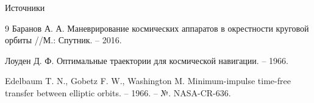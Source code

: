 \documentclass[9pt]{beamer}
\begin{document}
\begin{frame}[allowframebreaks]{Источники}
  \begin{thebibliography}{9}
    Баранов А. А. Маневрирование космических аппаратов в окрестности круговой орбиты //М.: Спутник. – 2016.

    Лоуден Д. Ф. Оптимальные траектории для космической навигации. – 1966.
  
    Edelbaum T. N., Gobetz F. W., Washington M. Minimum-impulse time-free transfer between elliptic orbits. – 1966. – №. NASA-CR-636.
    
  \end{thebibliography}
\end{frame}
\end{document}
